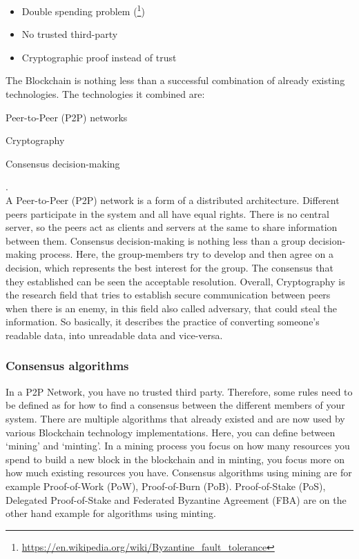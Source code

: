 \begin{itemize}[noitemsep]
	\item Double spending problem (\footnote{\url{https://en.wikipedia.org/wiki/Byzantine_fault_tolerance}})
	\item No trusted third-party
	\item Cryptographic proof instead of trust
\end{itemize}
The Blockchain is nothing less than a successful combination of already existing technologies. The technologies it combined are: 
\begin{enumerate*}[label={\arabic*)},font={\color{red!50!black}\bfseries}]
	\item Peer-to-Peer (P2P) networks 
	\item Cryptography
	\item Consensus decision-making
\end{enumerate*}.\\
A Peer-to-Peer (P2P) network is a form of a distributed architecture. Different peers participate in the system and all have equal rights. There is no central server, so the peers act as clients and servers at the same to share information between them. \cite{2001_Schollmeier}
Consensus decision-making is nothing less than a group decision-making process. Here, the group-members try to develop and then agree on a decision, which represents the best interest for the group. The consensus that they established can be seen the acceptable resolution.
Overall, Cryptography is the research field that tries to establish secure communication between peers when there is an enemy, in this field also called adversary, that could steal the information. So basically, it describes the practice of converting someone’s readable data, into unreadable data and vice-versa. \cite{2018_Meinel}

\subsubsection{Consensus algorithms}
In a P2P Network, you have no trusted third party. Therefore, some rules need to be defined as for how to find a consensus between the different members of your system. There are multiple algorithms that already existed and are now used by various Blockchain technology implementations. Here, you can define between ‘mining’ and ‘minting’. In a mining process you focus on how many resources you spend to build a new block in the blockchain and in minting, you focus more on how much existing resources you have. Consensus algorithms using mining are for example Proof-of-Work (PoW), Proof-of-Burn (PoB). Proof-of-Stake (PoS), Delegated Proof-of-Stake and Federated Byzantine Agreement (FBA) are on the other hand example for algorithms using minting.

